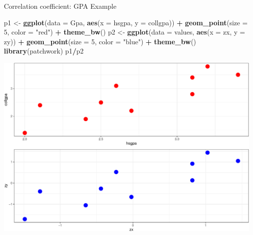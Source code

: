 \documentclass[
  ignorenonframetext,
]{beamer}
\newenvironment{Shaded}{\begin{snugshade}}{\end{snugshade}}
\newcommand{\AttributeTok}[1]{\textcolor[rgb]{0.13,0.29,0.53}{#1}}
\newcommand{\DecValTok}[1]{\textcolor[rgb]{0.00,0.00,0.81}{#1}}
\newcommand{\FunctionTok}[1]{\textcolor[rgb]{0.13,0.29,0.53}{\textbf{#1}}}
\newcommand{\NormalTok}[1]{#1}
\newcommand{\OtherTok}[1]{\textcolor[rgb]{0.56,0.35,0.01}{#1}}
\newcommand{\SpecialCharTok}[1]{\textcolor[rgb]{0.81,0.36,0.00}{\textbf{#1}}}
\newcommand{\StringTok}[1]{\textcolor[rgb]{0.31,0.60,0.02}{#1}}
\begin{document}
\begin{frame}[fragile]{Correlation coefficient: GPA Example}
\protect\hypertarget{correlation-coefficient-gpa-example-3}{}
\normalsize

\begin{Shaded}
\begin{Highlighting}[]
\NormalTok{p1 }\OtherTok{\textless{}{-}} \FunctionTok{ggplot}\NormalTok{(}\AttributeTok{data =}\NormalTok{ Gpa, }\FunctionTok{aes}\NormalTok{(}\AttributeTok{x =}\NormalTok{ hsgpa, }\AttributeTok{y =}\NormalTok{ collgpa)) }\SpecialCharTok{+} 
  \FunctionTok{geom\_point}\NormalTok{(}\AttributeTok{size =} \DecValTok{5}\NormalTok{, }\AttributeTok{color =} \StringTok{"red"}\NormalTok{) }\SpecialCharTok{+} 
  \FunctionTok{theme\_bw}\NormalTok{()}
\NormalTok{p2 }\OtherTok{\textless{}{-}} \FunctionTok{ggplot}\NormalTok{(}\AttributeTok{data =}\NormalTok{ values, }\FunctionTok{aes}\NormalTok{(}\AttributeTok{x =}\NormalTok{ zx, }\AttributeTok{y =}\NormalTok{ zy)) }\SpecialCharTok{+} 
  \FunctionTok{geom\_point}\NormalTok{(}\AttributeTok{size =} \DecValTok{5}\NormalTok{, }\AttributeTok{color =} \StringTok{"blue"}\NormalTok{) }\SpecialCharTok{+} 
  \FunctionTok{theme\_bw}\NormalTok{()}
\FunctionTok{library}\NormalTok{(patchwork)}
\NormalTok{p1}\SpecialCharTok{/}\NormalTok{p2}
\end{Highlighting}
\end{Shaded}

\begin{center}\includegraphics[width=0.6\linewidth,height=0.45\textheight]{Week4_Lect_files/figure-beamer/unnamed-chunk-13-1} \end{center}
\normalsize
\end{frame}
\end{document}
